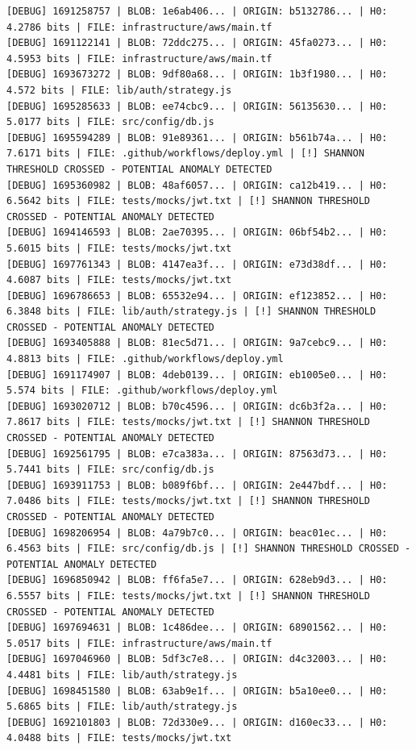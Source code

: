 \documentclass[12pt, a4paper, oneside]{report}
\begin{document}
\begin{lstlisting}[basicstyle=\tiny\ttfamily]
[DEBUG] 1691258757 | BLOB: 1e6ab406... | ORIGIN: b5132786... | H0: 4.2786 bits | FILE: infrastructure/aws/main.tf
[DEBUG] 1691122141 | BLOB: 72ddc275... | ORIGIN: 45fa0273... | H0: 4.5953 bits | FILE: infrastructure/aws/main.tf
[DEBUG] 1693673272 | BLOB: 9df80a68... | ORIGIN: 1b3f1980... | H0: 4.572 bits | FILE: lib/auth/strategy.js
[DEBUG] 1695285633 | BLOB: ee74cbc9... | ORIGIN: 56135630... | H0: 5.0177 bits | FILE: src/config/db.js
[DEBUG] 1695594289 | BLOB: 91e89361... | ORIGIN: b561b74a... | H0: 7.6171 bits | FILE: .github/workflows/deploy.yml | [!] SHANNON THRESHOLD CROSSED - POTENTIAL ANOMALY DETECTED
[DEBUG] 1695360982 | BLOB: 48af6057... | ORIGIN: ca12b419... | H0: 6.5642 bits | FILE: tests/mocks/jwt.txt | [!] SHANNON THRESHOLD CROSSED - POTENTIAL ANOMALY DETECTED
[DEBUG] 1694146593 | BLOB: 2ae70395... | ORIGIN: 06bf54b2... | H0: 5.6015 bits | FILE: tests/mocks/jwt.txt
[DEBUG] 1697761343 | BLOB: 4147ea3f... | ORIGIN: e73d38df... | H0: 4.6087 bits | FILE: tests/mocks/jwt.txt
[DEBUG] 1696786653 | BLOB: 65532e94... | ORIGIN: ef123852... | H0: 6.3848 bits | FILE: lib/auth/strategy.js | [!] SHANNON THRESHOLD CROSSED - POTENTIAL ANOMALY DETECTED
[DEBUG] 1693405888 | BLOB: 81ec5d71... | ORIGIN: 9a7cebc9... | H0: 4.8813 bits | FILE: .github/workflows/deploy.yml
[DEBUG] 1691174907 | BLOB: 4deb0139... | ORIGIN: eb1005e0... | H0: 5.574 bits | FILE: .github/workflows/deploy.yml
[DEBUG] 1693020712 | BLOB: b70c4596... | ORIGIN: dc6b3f2a... | H0: 7.8617 bits | FILE: tests/mocks/jwt.txt | [!] SHANNON THRESHOLD CROSSED - POTENTIAL ANOMALY DETECTED
[DEBUG] 1692561795 | BLOB: e7ca383a... | ORIGIN: 87563d73... | H0: 5.7441 bits | FILE: src/config/db.js
[DEBUG] 1693911753 | BLOB: b089f6bf... | ORIGIN: 2e447bdf... | H0: 7.0486 bits | FILE: tests/mocks/jwt.txt | [!] SHANNON THRESHOLD CROSSED - POTENTIAL ANOMALY DETECTED
[DEBUG] 1698206954 | BLOB: 4a79b7c0... | ORIGIN: beac01ec... | H0: 6.4563 bits | FILE: src/config/db.js | [!] SHANNON THRESHOLD CROSSED - POTENTIAL ANOMALY DETECTED
[DEBUG] 1696850942 | BLOB: ff6fa5e7... | ORIGIN: 628eb9d3... | H0: 6.5557 bits | FILE: tests/mocks/jwt.txt | [!] SHANNON THRESHOLD CROSSED - POTENTIAL ANOMALY DETECTED
[DEBUG] 1697694631 | BLOB: 1c486dee... | ORIGIN: 68901562... | H0: 5.0517 bits | FILE: infrastructure/aws/main.tf
[DEBUG] 1697046960 | BLOB: 5df3c7e8... | ORIGIN: d4c32003... | H0: 4.4481 bits | FILE: lib/auth/strategy.js
[DEBUG] 1698451580 | BLOB: 63ab9e1f... | ORIGIN: b5a10ee0... | H0: 5.6865 bits | FILE: lib/auth/strategy.js
[DEBUG] 1692101803 | BLOB: 72d330e9... | ORIGIN: d160ec33... | H0: 4.0488 bits | FILE: tests/mocks/jwt.txt

\end{lstlisting}
\end{document}
